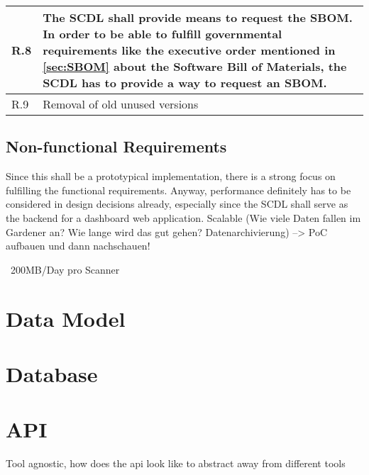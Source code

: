 \begin{xltabular}{\linewidth}{|l|X|}
	\\
	\hline
	R.8 & The SCDL shall provide means to request the SBOM.\newline\newline
	In order to be able to fulfill governmental requirements like the executive order mentioned in \ref{sec:SBOM} about the Software Bill of Materials, the SCDL has to provide a way to request an SBOM.\\
	\hline
	R.9 & Removal of old unused versions
\end{xltabular}

\subsection{Non-functional Requirements}
Since this shall be a prototypical implementation, there is a strong focus on fulfilling the functional requirements. Anyway, performance definitely has to be considered in design decisions already, especially since the SCDL shall serve as the backend for a dashboard web application.
Scalable (Wie viele Daten fallen im Gardener an? Wie lange wird das gut gehen? Datenarchivierung) --> PoC aufbauen und dann nachschauen! 

~200MB/Day pro Scanner

\section{Data Model}


\section{Database}
\section{API}
Tool agnostic, how does the api look like to abstract away from different tools
